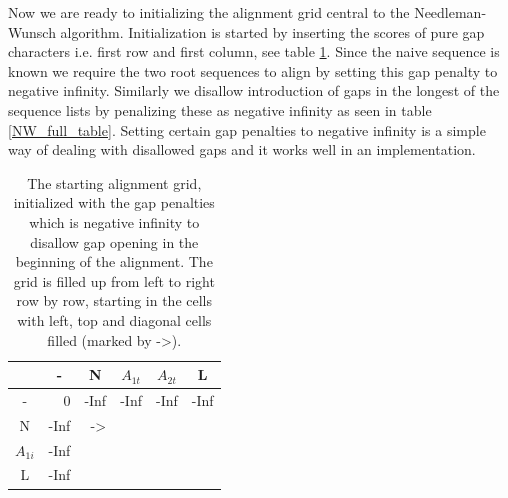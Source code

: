Now we are ready to initializing the alignment grid central to the Needleman-Wunsch algorithm.
Initialization is started by inserting the scores of pure gap characters i.e. first row and first column, see table \ref{NW_fill_table1}.
Since the naive sequence is known we require the two root sequences to align by setting this gap penalty to negative infinity.
Similarly we disallow introduction of gaps in the longest of the sequence lists by penalizing these as negative infinity as seen in table \ref{NW_full_table}.
Setting certain gap penalties to negative infinity is a simple way of dealing with disallowed gaps and it works well in an implementation.
\begin{table}[ht!]
\centering
\begin{tabular}{c|r|r|r|r|r|}
\rowcolor[HTML]{EFEFEF}
                                 & \multicolumn{1}{c|}{\cellcolor[HTML]{EFEFEF}-} & \multicolumn{1}{c|}{\cellcolor[HTML]{EFEFEF}N} & \multicolumn{1}{c|}{\cellcolor[HTML]{EFEFEF}$A_{1t}$} & \multicolumn{1}{c|}{\cellcolor[HTML]{EFEFEF}$A_{2t}$} & \multicolumn{1}{c|}{\cellcolor[HTML]{EFEFEF}L} \\ \hline
\cellcolor[HTML]{EFEFEF}-        & 0                                              & -Inf                                            & -Inf                                                   & -Inf                                                   & -Inf                                            \\ \hline
\cellcolor[HTML]{EFEFEF}N        & -Inf                                            & ->                                            &                                                    &                                                    &                                             \\ \hline
\cellcolor[HTML]{EFEFEF}$A_{1i}$ & -Inf                                            &                                             &                                                    &                                                    &                                             \\ \hline
\cellcolor[HTML]{EFEFEF}L        & -Inf                                            &                                             &                                                    &                                                    &                                             \\ \hline
\end{tabular}
    \caption{
         \label{NW_fill_table1}
             The starting alignment grid, initialized with the gap penalties which is negative infinity to disallow gap opening in the beginning of the alignment. The grid is filled up from left to right row by row, starting in the cells with left, top and diagonal cells filled (marked by ->).
             }
\end{table}


